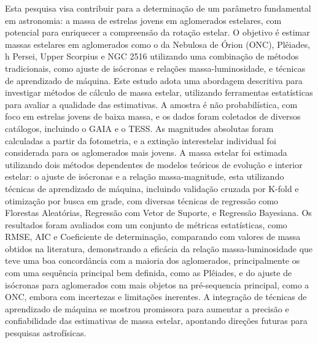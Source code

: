 %
%



\begin{resumo}

\vspace*{12pt}

\begin{SingleSpacing} 
            Esta pesquisa visa contribuir para a determinação de um parâmetro fundamental em astronomia: a massa de estrelas jovens em aglomerados estelares, com potencial para enriquecer a compreensão da rotação estelar. O objetivo é estimar massas estelares em aglomerados como o da Nebulosa de Órion (ONC), Plêiades, h Persei, Upper Scorpius e NGC 2516 utilizando uma combinação de métodos tradicionais, como ajuste de isócronas e relações massa-luminosidade, e técnicas de aprendizado de máquina. Este estudo adota uma abordagem descritiva para investigar métodos de cálculo de massa estelar, utilizando ferramentas estatísticas para avaliar a qualidade das estimativas. A amostra é não probabilística, com foco em estrelas jovens de baixa massa, e os dados foram coletados de diversos catálogos, incluindo o GAIA e o TESS. As magnitudes absolutas foram calculadas a partir da fotometria, e a extinção interestelar individual foi considerada para os aglomerados mais jovens. A massa estelar foi estimada utilizando dois métodos dependentes de modelos teóricos de evolução e interior estelar: o ajuste de isócronas e a relação massa-magnitude, esta utilizando técnicas de aprendizado de máquina, incluindo validação cruzada por K-fold e otimização por busca em grade, com diversas técnicas de regressão como Florestas Aleatórias, Regressão com Vetor de Suporte, e Regressão Bayesiana. Os resultados foram avaliados com um conjunto de métricas estatísticas, como RMSE, AIC e Coeficiente de determinação, comparando com valores de massa obtidos na literatura, demonstrando a eficácia da relação massa-luminosidade que teve uma boa concordância com a maioria dos aglomerados, principalmente os com uma sequência principal bem definida, como as Plêiades, e do ajuste de isócronas para aglomerados com mais objetos na pré-sequencia principal, como a ONC, embora com incertezas e limitações inerentes. A integração de técnicas de aprendizado de máquina se mostrou promissora para aumentar a precisão e confiabilidade das estimativas de massa estelar, apontando direções futuras para pesquisas astrofísicas.



 
\end{SingleSpacing}
\end{resumo}

